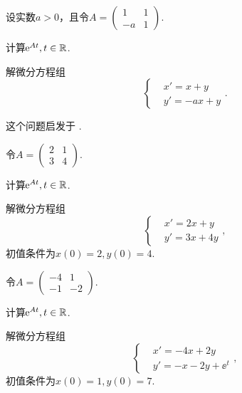 \begin{problem}
  设实数$a>0$，且令$A=\begin{pmatrix}
    1 & 1 \\
    -a & 1
  \end{pmatrix}$.
  \begin{enum}
    \item 计算$\operatorname{\!\!\;\mathrm e}^{At},t\in\mathbb R$.
    \item 解微分方程组
    \[
      \left\{
        \begin{aligned}
          & x' = x + y \\
          & y' = -ax + y
        \end{aligned}
      \right..
    \]
  \end{enum}
\end{problem}
\begin{remark}
  这个问题启发于 \cite[Example 5.2.5, p.238]{52}.
\end{remark}

\begin{problem}
  令$A=\begin{pmatrix}
    2 & 1 \\
    3 & 4
  \end{pmatrix}$.
  \begin{enum}
    \item 计算$\operatorname{\!\!\;\mathrm e}^{At},t\in\mathbb R$.
    \item 解微分方程组
    \[
      \left\{
        \begin{aligned}
          & x' = 2x + y \\
          & y' = 3x + 4y
        \end{aligned}
      \right.,
    \]
    初值条件为$x(0)=2,y(0)=4$.
  \end{enum}
\end{problem}

\begin{problem}
  令$A=\begin{pmatrix}
    -4 & 1 \\
    -1 & -2
  \end{pmatrix}$.
  \begin{enum}
    \item 计算$\operatorname{\!\!\;\mathrm e}^{At},t\in\mathbb R$.
    \item 解微分方程组
    \[
      \left\{
        \begin{aligned}
          & x' = -4x + 2y \\
          & y' = -x - 2y + \ee^t
        \end{aligned}
      \right.,
    \]
    初值条件为$x(0)=1,y(0)=7$.
  \end{enum}
\end{problem}

